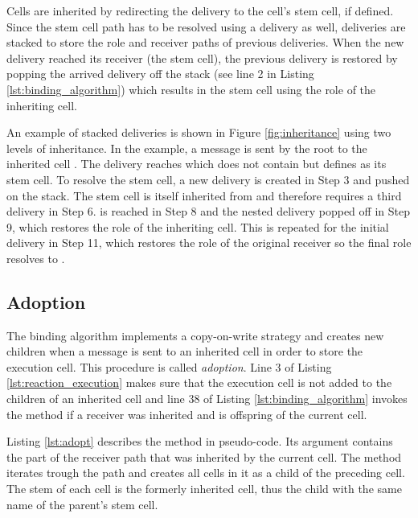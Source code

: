 Cells are inherited by redirecting the delivery to the cell's stem cell, if defined. Since the stem cell path has to be resolved using a delivery as well, deliveries are stacked to store the role and receiver paths of previous deliveries. When the new delivery reached its receiver (the stem cell), the previous delivery is restored by popping the arrived delivery off the stack (see line 2 in Listing \ref{lst:binding_algorithm}) which results in the stem cell using the role of the inheriting cell.

An example of stacked deliveries is shown in Figure \ref{fig:inheritance} using two levels of inheritance. In the example, a message is sent by the root to the inherited cell . The delivery reaches  which does not contain  but defines  as its stem cell. To resolve the stem cell, a new delivery is created in Step 3 and pushed on the stack. The stem cell  is itself inherited from  and therefore requires a third delivery in Step 6.  is reached in Step 8 and the nested delivery popped off in Step 9, which restores the role  of the inheriting cell. This is repeated for the initial delivery in Step 11, which restores the role of the original receiver so the final role resolves to .


\subsection{Adoption}
\label{sec:adoption}

The binding algorithm implements a copy-on-write strategy and creates new children when a message is sent to an inherited cell in order to store the execution cell. This procedure is called \textit{adoption}. Line 3 of Listing \ref{lst:reaction_execution} makes sure that the execution cell is not added to the children of an inherited cell and line 38 of Listing \ref{lst:binding_algorithm} invokes the method  if a receiver was inherited and is offspring of the current cell.

\sloppy
Listing \ref{lst:adopt} describes the  method in pseudo-code. Its argument  contains the part of the receiver path that was inherited by the current cell. The method iterates trough the path and creates all cells in it as a child of the preceding cell. The stem of each cell is the formerly inherited cell, thus the child with the same name of the parent's stem cell.
\fussy

